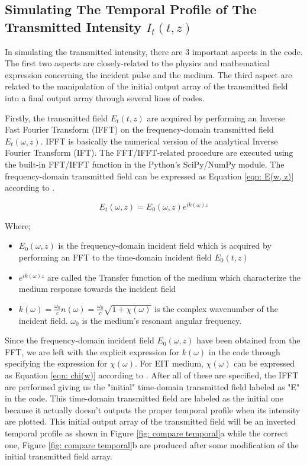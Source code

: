 \subsection{Simulating The Temporal Profile of The Transmitted Intensity $I_{t}(t, z)$}\label{temporalProfile}
In simulating the transmitted intensity, there are 3 important aspects in the code. The first two aspects are closely-related to the physics and mathematical expression concerning the incident pulse and the medium. The third aspect are related to the manipulation of the initial output array of the transmitted field into a final output array through several lines of codes.

Firstly, the transmitted field $E_{t}(t, z)$ are acquired by performing an Inverse Fast Fourier Transform (IFFT) on the frequency-domain transmitted field $E_{t}(\omega, z)$. IFFT is basically the numerical version of the analytical Inverse Fourier Transform (IFT). The FFT/IFFT-related procedure are executed using the built-in FFT/IFFT function in the Python's SciPy/NumPy module. The frequency-domain transmitted field can be expressed as Equation \ref{eqn: E(w, z)} according to \cite{jeong2006thesis}.

\begin{equation}
    E_{t}(\omega, z) = E_{0}(\omega, z) e^{i k(\omega) z}
    \label{eqn: E(w, z)}
\end{equation}

Where;

\begin{itemize}
    \item $E_{0}(\omega, z)$ is the frequency-domain incident field which is acquired by performing an FFT to the time-domain incident field $E_{0}(t, z)$
    \item $e^{i k(\omega) z}$ are called the Transfer function of the medium which characterize the medium response towards the incident field
    \item $k(\omega) = \frac{\omega_{0}}{c} n(\omega) = \frac{\omega_{0}}{c} \sqrt{1 + \chi(\omega)}$ is the complex wavenumber of the incident field. $\omega_{0}$ is the medium's resonant angular frequency.
\end{itemize}

Since the frequency-domain incident field $E_{0}(\omega, z)$ have been obtained from the FFT, we are left with the explicit expression for $k(\omega)$ in the code through specifying the expression for $\chi(\omega)$. For EIT medium, $\chi(\omega)$ can be expressed as Equation \ref{eqn: chi(w)} according to \cite{Jeong2009, Braje2004}. After all of these are specified, the IFFT are performed giving us the "initial" time-domain transmitted field labeled as "E" in the code. This time-domain transmitted field are labeled as the initial one because it actually doesn't outputs the proper temporal profile when its intensity are plotted. This initial output array of the transmitted field will be an inverted temporal profile as shown in Figure \ref{fig: compare temporal}a while the correct one, Figure \ref{fig: compare temporal}b are produced after some modification of the initial transmitted field array.

